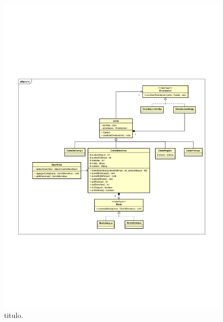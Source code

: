 \begin{figure}[H]
	\centering
	\includegraphics[scale=0.9]{includes/Cartas}
	\caption{titulo.}
	\label{Cartas}
\end{figure}

